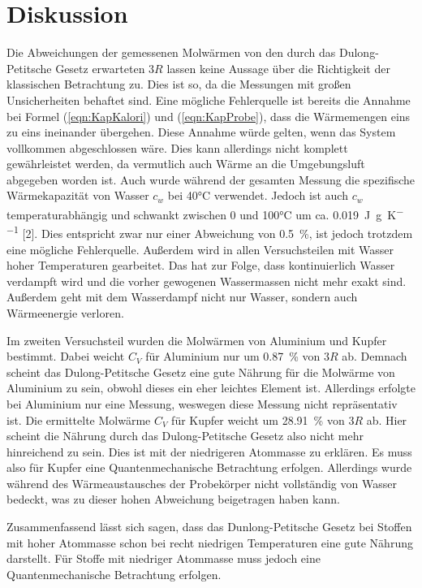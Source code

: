 \section{Diskussion}
\label{sec:Diskussion}

Die Abweichungen der gemessenen Molwärmen von den durch das Dulong-Petitsche 
Gesetz erwarteten $3R$ lassen keine Aussage über die Richtigkeit der 
klassischen Betrachtung zu. Dies ist so, da die Messungen mit großen
Unsicherheiten behaftet sind. Eine mögliche Fehlerquelle ist bereits
die Annahme bei Formel (\ref{eqn:KapKalori}) und (\ref{eqn:KapProbe}), 
dass die Wärmemengen eins zu eins ineinander übergehen. Diese Annahme 
würde gelten, wenn das System vollkommen abgeschlossen wäre. Dies kann
allerdings nicht komplett gewährleistet werden, da vermutlich auch Wärme an 
die Umgebungsluft abgegeben worden ist. 
Auch wurde während der gesamten Messung die spezifische Wärmekapazität 
von Wasser $c_w$ bei 40°C verwendet. Jedoch ist auch $c_w$ temperaturabhängig
und schwankt zwischen 0 und 100°C um ca. \SI{0.019}{\joule\per\gram\per\kelvin} [2].
Dies entspricht zwar nur einer Abweichung von \SI{0.5}{\percent}, ist jedoch
trotzdem eine mögliche Fehlerquelle.
Außerdem wird in allen Versuchsteilen mit Wasser hoher Temperaturen gearbeitet.
Das hat zur Folge, dass kontinuierlich Wasser verdampft wird und die vorher 
gewogenen Wassermassen nicht mehr exakt sind. Außerdem geht mit dem Wasserdampf 
nicht nur Wasser, sondern auch Wärmeenergie verloren. 

Im zweiten Versuchsteil wurden die Molwärmen von Aluminium und Kupfer bestimmt.
Dabei weicht $C_V$ für Aluminium nur um \SI{0.87}{\percent} von $3R$ ab. Demnach
scheint das Dulong-Petitsche Gesetz eine gute Nährung für die Molwärme
von Aluminium zu sein, obwohl dieses ein eher leichtes Element ist. Allerdings 
erfolgte bei Aluminium nur eine Messung, weswegen diese Messung nicht 
repräsentativ ist. 
Die ermittelte Molwärme $C_V$ für Kupfer weicht um \SI{28.91}{\percent} von $3R$ 
ab. Hier scheint die Nährung durch das Dulong-Petitsche Gesetz also nicht mehr 
hinreichend zu sein. Dies ist mit der niedrigeren Atommasse zu erklären. Es muss 
also für Kupfer eine Quantenmechanische Betrachtung erfolgen.
Allerdings wurde während des Wärmeaustausches der Probekörper nicht vollständig
von Wasser bedeckt, was zu dieser hohen Abweichung beigetragen haben kann. 

Zusammenfassend lässt sich sagen, dass das Dunlong-Petitsche Gesetz bei Stoffen
mit hoher Atommasse schon bei recht niedrigen Temperaturen eine gute Nährung 
darstellt. Für Stoffe mit niedriger Atommasse muss jedoch eine 
Quantenmechanische Betrachtung erfolgen.